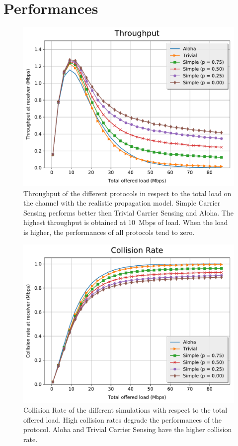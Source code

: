 \section{Performances}
\label{sec:performances}

\begin{figure}[t!]
	\centering
	\centering
	\includegraphics[width=\columnwidth]{figures/plots/realistic_tr}
	\caption{Throughput of the different protocols in respect to the total load on the channel with the realistic propagation model. Simple Carrier Sensing performs better then Trivial Carrier Sensing and Aloha. The highest throughput is obtained at \SI{10}{Mbps} of load. When the load is higher, the performances of all protocols tend to zero.}
	\label{fig:tr}
\end{figure}

\begin{figure}[t!]
	\centering
    \includegraphics[width=\columnwidth]{figures/plots/realistic_cr}
	\caption{Collision Rate of the different simulations with respect to the total offered load. High collision rates degrade the performances of the protocol. Aloha and Trivial Carrier Sensing have the higher collision rate.}
	\label{fig:cr}
\end{figure}

